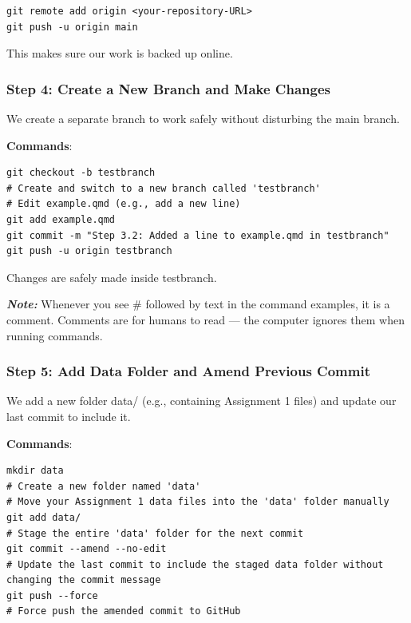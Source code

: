 \documentclass[
  11pt,
  a4paper,
]{article}
\begin{document}
\begin{verbatim}
git remote add origin <your-repository-URL>
git push -u origin main
\end{verbatim}

This makes sure our work is backed up online.

\newpage

\subsubsection{Step 4: Create a New Branch and Make
Changes}\label{step-4-create-a-new-branch-and-make-changes}

We create a separate branch to work safely without disturbing the main
branch.

\textbf{Commands}:

\begin{verbatim}
git checkout -b testbranch
# Create and switch to a new branch called 'testbranch'
# Edit example.qmd (e.g., add a new line)
git add example.qmd
git commit -m "Step 3.2: Added a line to example.qmd in testbranch"
git push -u origin testbranch
\end{verbatim}

Changes are safely made inside testbranch.

\textbf{\emph{Note:}} Whenever you see \# followed by text in the
command examples, it is a comment. Comments are for humans to read ---
the computer ignores them when running commands.

\newpage

\subsubsection{Step 5: Add Data Folder and Amend Previous
Commit}\label{step-5-add-data-folder-and-amend-previous-commit}

We add a new folder data/ (e.g., containing Assignment 1 files) and
update our last commit to include it.

\textbf{Commands}:

\begin{verbatim}
mkdir data
# Create a new folder named 'data'
# Move your Assignment 1 data files into the 'data' folder manually
git add data/
# Stage the entire 'data' folder for the next commit
git commit --amend --no-edit
# Update the last commit to include the staged data folder without changing the commit message
git push --force
# Force push the amended commit to GitHub
\end{verbatim}
\end{document}
